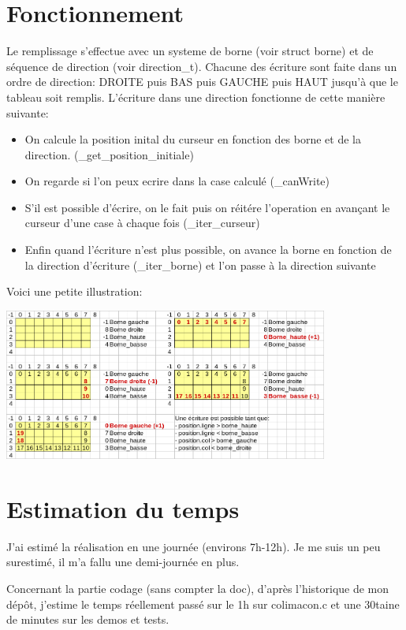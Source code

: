 \documentclass[a4paper]{article}
\begin{document}
\section{Fonctionnement}

Le remplissage s'effectue avec un systeme de borne (voir struct borne) et de séquence de direction (voir direction\_t).
Chacune des écriture sont faite dans un ordre de direction: DROITE puis BAS puis GAUCHE puis HAUT jusqu'à que le tableau soit remplis.
L'écriture dans une direction fonctionne de cette manière suivante:
\begin{itemize}
  \item On calcule la position inital du curseur en fonction des borne et de la direction. (\_get\_position\_initiale)
  \item On regarde si l'on peux ecrire dans la case calculé (\_canWrite)
  \item S'il est possible d'écrire, on le fait puis on réitére l'operation en avançant le curseur d'une case à chaque fois (\_iter\_curseur)
  \item Enfin quand l'écriture n'est plus possible, on avance la borne en fonction de la direction d'écriture (\_iter\_borne) et l'on passe à la direction suivante
\end{itemize}
Voici une petite illustration:

\includegraphics[width=0.8\textwidth]{exemple.png}


\section{Estimation du temps}

J'ai estimé la réalisation en une journée (environs 7h-12h). Je me suis un peu
surestimé, il m'a fallu une demi-journée en plus.

Concernant la partie codage (sans compter la doc), d'après l'historique de
mon dépôt, j'estime le temps réellement passé sur le 1h sur colimacon.c et
une 30taine de minutes sur les demos et tests.
\end{document}
